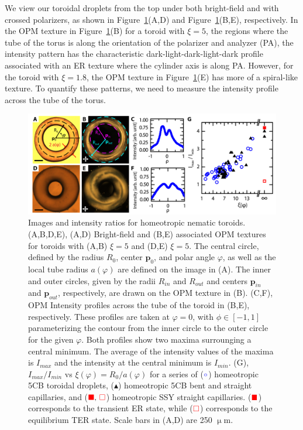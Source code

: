 We view our toroidal droplets from the top under both bright-field and with crossed polarizers, as shown in Figure~\ref{f:4-HomeoToroidsExp}(A,D) and Figure~\ref{f:4-HomeoToroidsExp}(B,E), respectively.
In the OPM texture in Figure~\ref{f:4-HomeoToroidsExp}(B) for a toroid with $\xi = 5$, the regions where the tube of the torus is along the orientation of the polarizer and analyzer (PA), the intensity pattern has the characteristic dark-light-dark-light-dark profile associated with an ER texture where the cylinder axis is along PA.
However, for the toroid with $\xi = 1.8$, the OPM texture in Figure~\ref{f:4-HomeoToroidsExp}(E) has more of a spiral-like texture.
To quantify these patterns, we need to measure the intensity profile across the tube of the torus.
\begin{figure}
  \centering
  \includegraphics{figures/C4/Ch4-Figs_HomeoToroidsExp.png}
  \caption{Images and intensity ratios for homeotropic nematic toroids.
  (A,B,D,E), (A,D) Bright-field and (B,E) associated OPM textures for toroids with (A,B) $\xi = 5$ and (D,E) $\xi = 5$.
  The central circle, defined by the radius $R_{0}$, center $\mathbf{p}_0$, and polar angle $\varphi$, as well as the local tube radius $a(\varphi)$ are defined on the image in (A).
  The inner and outer circles, given by the radii $R_{in}$ and $R_{out}$ and centers $\mathbf{p}_{in}$ and $\mathbf{p}_{out}$, respectively, are drawn on the OPM texture in (B).
  (C,F), OPM Intensity profiles across the tube of the toroid in (B,E), respectively.
  These profiles are taken at $\varphi = 0$, with $\phi \in [-1,1]$ parameterizing the contour from the inner circle to the outer circle for the given $\varphi$.
  Both profiles show two maxima surrounging a central minimum.
  The average of the intensity values of the maxima is $I_{max}$ and the intensity at the central minimum is $I_{min}$.
  (G), $I_{max}/I_{min}$ vs $\xi(\varphi) = R_0/a(\varphi)$ for a series of (${\color{blue} \circ}$) homeotropic 5CB toroidal droplets, (${\blacktriangle}$) homeotropic 5CB bent and straight capillaries, and (${\color{red} \blacksquare},\,{\color{red} \square}$) homeotropic SSY straight capillaries.
     (${\color{red} \blacksquare}$) corresponds to the transient ER state, while (${\color{red} \square}$) corresponds to the equilibrium TER state.
     Scale bars in (A,D) are 250 $\upmu$m.}\label{f:4-HomeoToroidsExp}
\end{figure}

